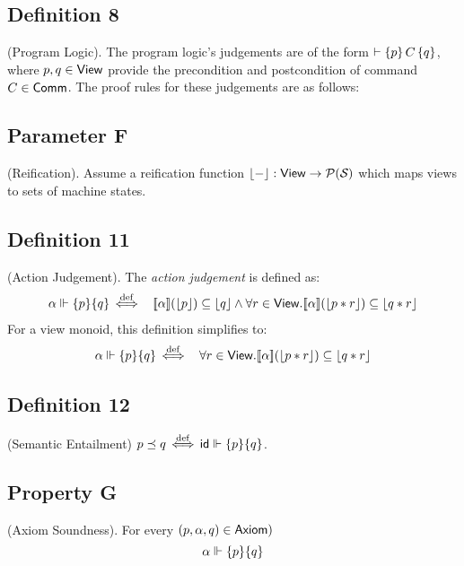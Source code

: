 \subsection{Definition 8} (Program Logic).
The program logic’s judgements
are of the form
$\vdash \{p\}\, {C}\, \{q\}$,
where $p, q \in \mathsf{View}$ provide the
precondition and postcondition of command $C \in \mathsf{Comm}$. The
proof rules for these judgements are as follows:

\subsection{Parameter F} (Reification).
Assume a reification function
$\lfloor{-}\rfloor : \mathsf{View} \rightarrow \mathcal{P}(\mathcal{S}_{\mathsf{}})$
which maps views to sets of machine states.

\subsection{Definition 11} (Action Judgement).
The \emph{action judgement} is defined
as:
\begin{eqnarray*}
   {\alpha} \Vdash \{p\} \{q\}
   &\mathrel{\stackrel{\mathrm{def}}{\,\Leftarrow\!\Rightarrow\,}}&
   [\![{\alpha}]\!](\lfloor{p}\rfloor) \subseteq \lfloor{q}\rfloor
   \land
   \forall r \in \mathsf{View} . [\![{\alpha}]\!](\lfloor{p*r}\rfloor) \subseteq \lfloor{q*r}\rfloor
\end{eqnarray*}
For a view monoid, this definition simplifies to:
\begin{eqnarray*}
   {\alpha} \Vdash \{p\} \{q\}
   &\mathrel{\stackrel{\mathrm{def}}{\,\Leftarrow\!\Rightarrow\,}}&
   \forall r \in \mathsf{View} . [\![{\alpha}]\!](\lfloor{p*r}\rfloor) \subseteq \lfloor{q*r}\rfloor
\end{eqnarray*}

\subsection{Definition 12} (Semantic Entailment)
$p \preceq q  \mathrel{\stackrel{\mathrm{def}}{\,\Leftarrow\!\Rightarrow\,}} {\mathsf{id}} \Vdash \{p\} \{q\}$.

\subsection{Property G} (Axiom Soundness).
For every $(p,\alpha,q) \in \mathsf{Axiom})$
\[
  {\alpha} \Vdash \{p\} \{q\}
\]

\setcounter{secnumdepth}{4}
